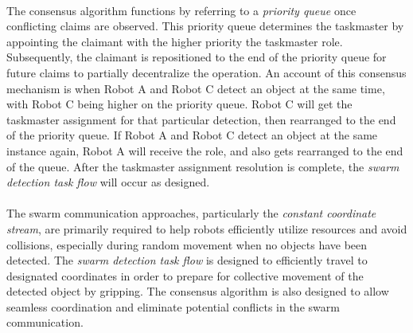 \paragraph*{}
The consensus algorithm functions by referring to a \textit{priority queue} once conflicting claims are observed. This priority queue determines the taskmaster by appointing the claimant with the higher priority the taskmaster role. Subsequently, the claimant is repositioned to the end of the priority queue for future claims to partially decentralize the operation. An account of this consensus mechanism is when Robot A and Robot C detect an object at the same time, with Robot C being higher on the priority queue. Robot C will get the taskmaster assignment for that particular detection, then rearranged to the end of the priority queue. If Robot A and Robot C detect an object at the same instance again, Robot A will receive the role, and also gets rearranged to the end of the queue. After the taskmaster assignment resolution is complete, the \textit{swarm detection task flow} will occur as designed.

\paragraph*{}
The swarm communication approaches, particularly the \textit{constant coordinate stream}, are primarily required to help robots efficiently utilize resources and avoid collisions, especially during random movement when no objects have been detected. The \textit{swarm detection task flow} is designed to efficiently travel to designated coordinates in order to prepare for collective movement of the detected object by gripping. The consensus algorithm is also designed to allow seamless coordination and eliminate potential conflicts in the swarm communication.
